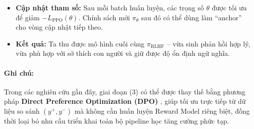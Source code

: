 \begin{itemize}
    \item \textbf{Cập nhật tham số:}  
    Sau mỗi batch huấn luyện, các trọng số \( \theta \) được tối ưu để giảm \( -L_{\text{PPO}}(\theta) \).  
    Chính sách mới \(\pi_{\theta}\) sau đó có thể dùng làm “anchor” cho vòng cập nhật tiếp theo.

    \item \textbf{Kết quả:}  
    Ta thu được mô hình cuối cùng \( \pi_{\text{RLHF}} \) – vừa sinh phản hồi hợp lý, vừa phù hợp với sở thích con người và giữ được độ ổn định ngữ nghĩa.
\end{itemize}


\paragraph{Ghi chú:}
Trong các nghiên cứu gần đây, giai đoạn (3) có thể được thay thế bằng phương pháp \textbf{Direct Preference Optimization (DPO)} \cite{rafailov2023direct}, giúp tối ưu trực tiếp từ dữ liệu so sánh $(y^+, y^-)$ mà không cần huấn luyện Reward Model riêng biệt, đồng thời loại bỏ nhu cầu triển khai toàn bộ pipeline học tăng cường phức tạp.

